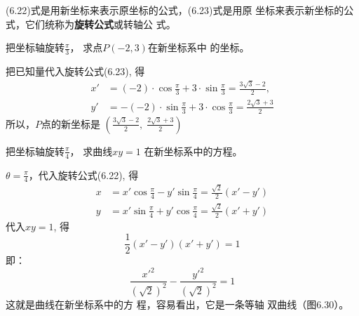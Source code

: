 (6.22)式是用新坐标来表示原坐标的公式，(6.23)式是用原
坐标来表示新坐标的公式，它们统称为\textbf{旋转公式}或转轴公
式。

\begin{example}
    把坐标轴旋转$\frac{\pi}{3}$，
求点$P(-2,3)$在新坐标系中
的坐标。
\end{example}

\begin{solution}
把已知量代入旋转公式(6.23), 得
\[\begin{split}
x'&=(-2)\cdot \cos\frac{\pi}{3}+3\cdot \sin\frac{\pi}{3}=\frac{3\sqrt{3}-2}{2},\\
y'&=-(-2)\cdot\sin\frac{\pi}{3}+3\cdot \cos\frac{\pi}{3}=\frac{2\sqrt{3}+3}{2}
\end{split}\]
所以，$P$点的新坐标是
$\left(\frac{3\sqrt{3}-2}{2}, \; \frac{2\sqrt{3}+3}{2}\right)$
\end{solution}

\begin{example}
    把坐标轴旋转$\frac{\pi}{4}$，
求曲线$xy=1$
在新坐标系中的方程。
\end{example}


\begin{solution}
    $\theta=\frac{\pi}{4}$，代入旋转公式(6.22), 得
\[\begin{split}
    x&=x'\cos\frac{\pi}{4}-y'\sin \frac{\pi}{4}=\frac{\sqrt{2}}{2}(x'-y')\\
    y&=x'\sin\frac{\pi}{4}+y'\cos\frac{\pi}{4}=\frac{\sqrt{2}}{2}(x'+y')
\end{split}\]
代入$xy=1$, 得
\[\frac{1}{2}(x'-y')(x'+y')=1\]
即：
\[\frac{{x'}^2}{\left(\sqrt{2}\right)^2}-\frac{{y'}^2}{\left(\sqrt{2}\right)^2}=1\]
这就是曲线在新坐标系中的方
程，容易看出，它是一条等轴
双曲线（图6.30）。
\end{solution}

\begin{figure}[htp]
    \centering
    \caption{}
\end{figure}

